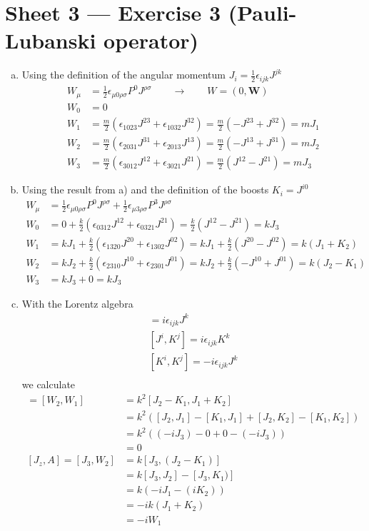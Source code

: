 \documentclass[10pt,a4paper]{report}
\theoremstyle{definition}
\begin{document}
\section{Sheet 3 — Exercise 3 (Pauli-Lubanski operator)}
\begin{enumerate}[a)]
\item Using the definition of the angular momentum $J_i=\frac{1}{2}\epsilon_{ijk}J^{jk}$
\begin{align}
W_\mu
&=\frac{1}{2}\epsilon_{\mu0\rho\sigma}P^0J^{\rho\sigma}\qquad\rightarrow\qquad W=(0,\mathbf{W})\\
W_0&=0\\
W_1&=\frac{m}{2}\left(
\epsilon_{1023}J^{23}
+\epsilon_{1032}J^{32}
\right)
=\frac{m}{2}\left(-J^{23}+J^{32}\right)=mJ_1\\
W_2&=\frac{m}{2}\left(
\epsilon_{2031}J^{31}
+\epsilon_{2013}J^{13}
\right)
=\frac{m}{2}\left(-J^{13}+J^{31}\right)=mJ_2\\
W_3&=\frac{m}{2}\left(
\epsilon_{3012}J^{12}
+\epsilon_{3021}J^{21}
\right)
=\frac{m}{2}\left(J^{12}-J^{21}\right)=mJ_3
\end{align}
\item Using the result from a) and the definition of the boosts $K_i=J^{i0}$
\begin{align}
W_\mu
&=\frac{1}{2}\epsilon_{\mu0\rho\sigma}P^0J^{\rho\sigma}+
\frac{1}{2}\epsilon_{\mu3\rho\sigma}P^3J^{\rho\sigma}\\
W_0
&=0+\frac{k}{2}(\epsilon_{0312}J^{12}+\epsilon_{0321}J^{21})
=\frac{k}{2}(J^{12}-J^{21})
=kJ_3\\
W_1
&=kJ_1+\frac{k}{2}(\epsilon_{1320}J^{20}+\epsilon_{1302}J^{02})
=kJ_1+\frac{k}{2}(J^{20}-J^{02})
=k(J_1+K_2)\\
W_2
&=kJ_2+\frac{k}{2}(\epsilon_{2310}J^{10}+\epsilon_{2301}J^{01})
=kJ_2+\frac{k}{2}(-J^{10}+J^{01})
=k(J_2-K_1)\\
W_3
&=kJ_3+0
=kJ_3
\end{align}

\item With the Lorentz algebra
\begin{align}
[J^i,J^j]=i\epsilon_{ijk}J^k\\
[J^i,K^j]=i\epsilon_{ijk}K^k\\
[K^i,K^j]=-i\epsilon_{ijk}J^k\\
\end{align}
we calculate
\begin{align}
[A,B]=[W_2,W_1] 
&= k^2[J_2-K_1,J_1+K_2]\\
&=k^2([J_2,J_1]-[K_1,J_1]+[J_2,K_2]-[K_1,K_2])\\
&= k^2((-iJ_3)-0+0-(-iJ_3))\\
&=0\\
[J_z,A]=[J_3,W_2]
&=k[J_3,(J_2-K_1)]\\
&=k[J_3,J_2]-[J_3,K_1)]\\
&=k(-iJ_1-(iK_2))\\
&=-ik(J_1+K_2)\\
&=-iW_1
\end{align}
\end{enumerate}
\newpage
\end{document}
